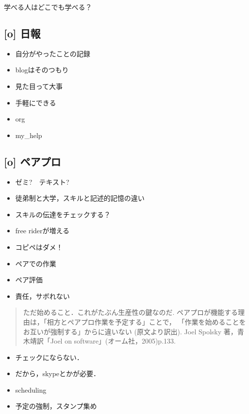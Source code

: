 \documentclass{hissymp}
\begin{document}
学べる人はどこでも学べる？

\subsection{[o] 日報}
\label{sec:org02968e8}
\begin{itemize}
\item 自分がやったことの記録
\item blogはそのつもり
\item 見た目って大事
\item 手軽にできる
\item org
\item my\_help
\end{itemize}

\subsection{[o] ペアプロ}
\label{sec:org19378a4}
\begin{itemize}
\item ゼミ?　テキスト?
\item 徒弟制と大学，スキルと記述的記憶の違い
\item スキルの伝達をチェックする？
\item free riderが増える
\item コピペはダメ！
\item ペアでの作業
\item ペア評価
\item 責任，サボれない
\end{itemize}

\begin{quote}
ただ始めること．これがたぶん生産性の鍵なのだ.
ペアプロが機能する理由は，「相方とペアプロ作業を予定する」ことで，
「作業を始めることをお互いが強制する」からに違いない
(原文より訳出).
Joel Spolsky 著，青木靖訳「Joel on software」(オーム社，2005)p.133.
\end{quote}

\begin{itemize}
\item チェックにならない．
\item だから，skypeとかが必要．

\item scheduling
\item 予定の強制，スタンプ集め
\end{itemize}
\end{document}
